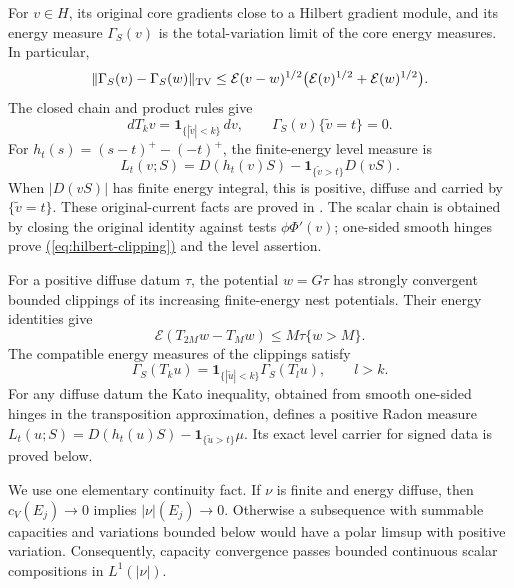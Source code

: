 \documentclass[11pt,reqno]{amsart}
\theoremstyle{definition}
\theoremstyle{remark}
\numberwithin{equation}{section}
\newcommand{\MathEqref}[1]{\begingroup\hypersetup{linkcolor=EquationLink}\hyperref[#1]{(\ref*{#1})}\endgroup}
\begin{document}
For $v\in H$, its original core gradients close to a Hilbert gradient
module, and its energy measure $\Gamma_S(v)$ is the total-variation
limit of the core energy measures. In particular,
\begin{equation}\label{eq:energy-variation-norm}
 \|\Gamma_S(v)-\Gamma_S(w)\|_{\rm TV}
 \le\mathcal E(v-w)^{1/2}
       \bigl(\mathcal E(v)^{1/2}+\mathcal E(w)^{1/2}\bigr).
\end{equation}
The closed chain and product rules give
\begin{equation}\label{eq:hilbert-clipping}
 dT_kv=\mathbf1_{\{|\widetilde v|<k\}}\,dv,
 \qquad \Gamma_S(v)\{\widetilde v=t\}=0.
\end{equation}
For $h_t(s)=(s-t)^+-(-t)^+$, the finite-energy level measure is
\begin{equation}\label{eq:hilbert-level}
 L_t(v;S)=D(h_t(v)S)-\mathbf1_{\{\widetilde v>t\}}D(vS).
\end{equation}
When $|D(vS)|$ has finite energy integral, this is positive, diffuse
and carried by $\{\widetilde v=t\}$. These original-current facts
are proved in \cite[Sections 41--42]{Energy}. The scalar chain is
obtained by closing the original identity against tests
$\phi\Phi'(v)$; one-sided smooth hinges prove
\MathEqref{eq:hilbert-clipping} and the level assertion.

For a positive diffuse datum $\tau$, the potential $w=G\tau$ has
strongly convergent bounded clippings of its increasing finite-energy
nest potentials. Their energy identities give
\begin{equation}\label{eq:positive-band}
 \mathcal E(T_{2M}w-T_Mw)
                  \le M\tau\{w>M\}.
\end{equation}
The compatible energy measures of the clippings satisfy
\begin{equation}\label{eq:compatible-clippings}
 \Gamma_S(T_ku)
      =\mathbf1_{\{|\widetilde u|<k\}}\Gamma_S(T_lu),\qquad l>k.
\end{equation}
For any diffuse datum the Kato inequality, obtained from smooth
one-sided hinges in the transposition approximation, defines a positive
Radon measure
$L_t(u;S)=D(h_t(u)S)-\mathbf1_{\{\widetilde u>t\}}\mu$.
Its exact level carrier for signed data is proved below.

We use one elementary continuity fact. If $\nu$ is finite and
energy diffuse, then $c_V(E_j)\to0$ implies $|\nu|(E_j)\to0$.
Otherwise a subsequence with summable capacities and variations bounded
below would have a polar limsup with positive variation. Consequently,
capacity convergence passes bounded continuous scalar compositions in
$L^1(|\nu|)$.
\end{document}
